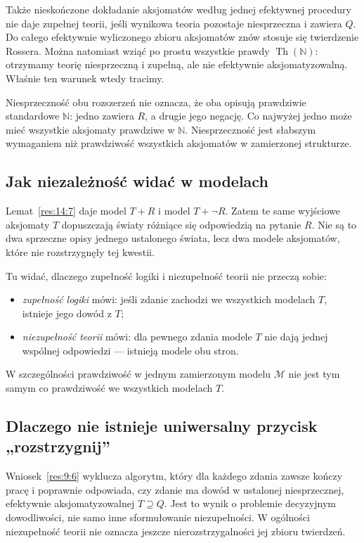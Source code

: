 Także nieskończone dokładanie aksjomatów według jednej efektywnej procedury nie daje zupełnej teorii, jeśli wynikowa teoria pozostaje niesprzeczna i zawiera $Q$. Do całego efektywnie wyliczonego zbioru aksjomatów znów stosuje się twierdzenie Rossera. Można natomiast wziąć po prostu wszystkie prawdy $\operatorname{Th}(\mathbb N)$: otrzymamy teorię niesprzeczną i zupełną, ale nie efektywnie aksjomatyzowalną. Właśnie ten warunek wtedy tracimy.

Niesprzeczność obu rozszerzeń nie oznacza, że oba opisują prawdziwie standardowe $\mathbb N$: jedno zawiera $R$, a drugie jego negację. Co najwyżej jedno może mieć wszystkie aksjomaty prawdziwe w $\mathbb N$. Niesprzeczność jest słabszym wymaganiem niż prawdziwość wszystkich aksjomatów w zamierzonej strukturze.

\subsection*{Jak niezależność widać w modelach}\label{sec:16:3}
Lemat~\ref{res:14:7} daje model $T+R$ i model $T+\neg R$. Zatem te same wyjściowe aksjomaty $T$ dopuszczają światy różniące się odpowiedzią na pytanie $R$. Nie są to dwa sprzeczne opisy jednego ustalonego świata, lecz dwa modele aksjomatów, które nie rozstrzygnęły tej kwestii.

Tu widać, dlaczego zupełność logiki i niezupełność teorii nie przeczą sobie:
\begin{itemize}
\item \emph{zupełność logiki} mówi: jeśli zdanie zachodzi we wszystkich modelach $T$, istnieje jego dowód z $T$;
\item \emph{niezupełność teorii} mówi: dla pewnego zdania modele $T$ nie dają jednej wspólnej odpowiedzi --- istnieją modele obu stron.
\end{itemize}
W szczególności prawdziwość w jednym zamierzonym modelu $\mathcal M$ nie jest tym samym co prawdziwość we wszystkich modelach $T$.

\subsection*{Dlaczego nie istnieje uniwersalny przycisk „rozstrzygnij”}\label{sec:16:4}
Wniosek~\ref{res:9:6} wyklucza algorytm, który dla każdego zdania zawsze kończy pracę i poprawnie odpowiada, czy zdanie ma dowód w ustalonej niesprzecznej, efektywnie aksjomatyzowalnej $T\supseteq Q$. Jest to wynik o problemie decyzyjnym dowodliwości, nie samo inne sformułowanie niezupełności. W ogólności niezupełność teorii nie oznacza jeszcze nierozstrzygalności jej zbioru twierdzeń.

